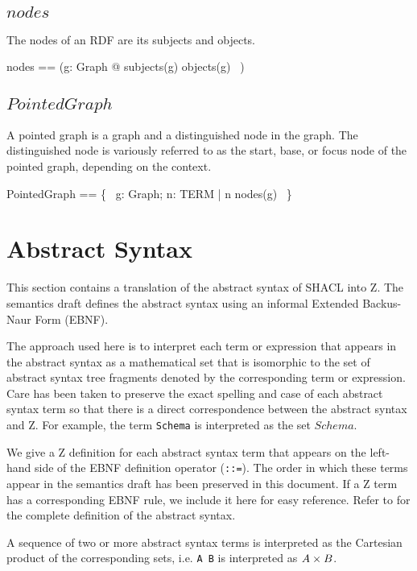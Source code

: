 \documentclass{article}
\begin{document}
\subsection{$nodes$}
The nodes of an RDF are its subjects and objects.
\begin{zed}
	nodes == (\lambda g: Graph @ subjects(g) \cup objects(g) ~)
\end{zed}

\subsection{$PointedGraph$}
A pointed graph is a graph and a distinguished node in the graph.
The distinguished node is variously referred to as the start, base, or focus node of the pointed graph, depending on the context.
\begin{zed}
	PointedGraph == \{~ g: Graph; n: TERM | n \in nodes(g) ~\}
\end{zed}

\section{Abstract Syntax}
\label{sec-abstract-syntax}
This section contains a translation of the abstract syntax of SHACL into Z.
The semantics draft defines the abstract syntax using an informal Extended Backus-Naur Form (EBNF).

The approach used here is to interpret each term or expression that appears in the abstract syntax as
a mathematical set that is isomorphic to the set of abstract syntax tree fragments denoted by the corresponding term or expression.
Care has been taken to preserve the exact spelling and case of each abstract syntax term so that there is a direct correspondence
between the abstract syntax and Z.
For example, the term {\tt Schema} is interpreted as the set $Schema$.

We give a Z definition for each abstract syntax term that appears on the left-hand side of the EBNF definition operator ({\tt ::=}).
The order in which these terms appear in the semantics draft has been preserved in this document.
If a Z term has a corresponding EBNF rule, we include it here for easy reference.
Refer to \cite{iovka:core-shacl} for the complete definition of the abstract syntax.

A sequence of two or more abstract syntax terms is interpreted as the Cartesian product of the corresponding sets, i.e.
{\tt A B} is interpreted as $A \times B$.
\end{document}
